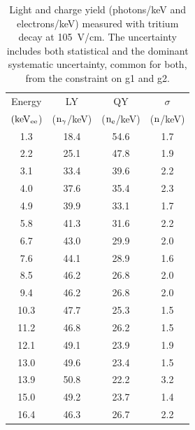 \begin{table}[h!]
\centering
\begin{tabular}{|c|c|c|c|} \hline
Energy 	& 		LY	& 	QY	& $\sigma$ \\ 
$\rm (keV_{ee}$) & ($\rm n_\gamma$/keV)   & ($\rm n_e$/keV) & ($\rm n$/keV) \\ \hline
1.3 	 & 18.4 	 & 54.6 	 & 1.7 	 \\ \hline 
2.2 	 & 25.1 	 & 47.8 	 & 1.9 	 \\ \hline 
3.1 	 & 33.4 	 & 39.6 	 & 2.2 	 \\ \hline 
4.0 	 & 37.6 	 & 35.4 	 & 2.3 	 \\ \hline 
4.9 	 & 39.9 	 & 33.1 	 & 1.7 	 \\ \hline 
5.8 	 & 41.3 	 & 31.6 	 & 2.2 	 \\ \hline 
6.7 	 & 43.0 	 & 29.9 	 & 2.0 	 \\ \hline 
7.6 	 & 44.1 	 & 28.9 	 & 1.6 	 \\ \hline 
8.5 	 & 46.2 	 & 26.8 	 & 2.0 	 \\ \hline 
9.4 	 & 46.2 	 & 26.8 	 & 2.0 	 \\ \hline 
10.3 	 & 47.7 	 & 25.3 	 & 1.5 	 \\ \hline 
11.2 	 & 46.8 	 & 26.2 	 & 1.5 	 \\ \hline 
12.1 	 & 49.1 	 & 23.9 	 & 1.9 	 \\ \hline 
13.0 	 & 49.6 	 & 23.4 	 & 1.5 	 \\ \hline 
13.9 	 & 50.8 	 & 22.2 	 & 3.2 	 \\ \hline 
15.0 	 & 49.2 	 & 23.7 	 & 1.4 	 \\ \hline 
16.4 	 & 46.3 	 & 26.7 	 & 2.2 	 \\ \hline 
\end{tabular}
\caption{Light and charge yield (photons/keV and electrons/keV) measured with tritium decay at 105~V/cm. The uncertainty includes both statistical and the dominant systematic uncertainty, common for both, from the constraint on g1 and g2. }
\label{table:Yields_100}
\end{table}


